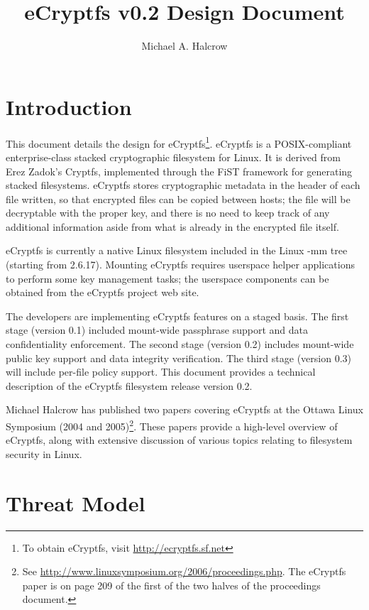 \documentclass{article}
\begin{document}
\title{eCryptfs v0.2 Design Document}

\author{Michael A. Halcrow}

\maketitle

\tableofcontents

\section{Introduction}

This document details the design for eCryptfs\footnote{To obtain
eCryptfs, visit \url{http://ecryptfs.sf.net}}. eCryptfs is a
POSIX-compliant enterprise-class stacked cryptographic filesystem for
Linux. It is derived from Erez Zadok's Cryptfs, implemented through
the FiST framework for generating stacked filesystems. eCryptfs stores
cryptographic metadata in the header of each file written, so that
encrypted files can be copied between hosts; the file will be
decryptable with the proper key, and there is no need to keep track of
any additional information aside from what is already in the encrypted
file itself.

eCryptfs is currently a native Linux filesystem included in the Linux
-mm tree (starting from 2.6.17). Mounting eCryptfs requires userspace
helper applications to perform some key management tasks; the
userspace components can be obtained from the eCryptfs project web
site.

The developers are implementing eCryptfs features on a staged
basis. The first stage (version 0.1) included mount-wide passphrase
support and data confidentiality enforcement. The second stage
(version 0.2) includes mount-wide public key support and data
integrity verification. The third stage (version 0.3) will include
per-file policy support. This document provides a technical
description of the eCryptfs filesystem release version 0.2.

Michael Halcrow has published two papers covering eCryptfs at the
Ottawa Linux Symposium (2004 and 2005)\footnote{See
\url{http://www.linuxsymposium.org/2006/proceedings.php}. The eCryptfs
paper is on page 209 of the first of the two halves of the proceedings
document.}. These papers provide a high-level overview of eCryptfs,
along with extensive discussion of various topics relating to
filesystem security in Linux.

\section{Threat Model}
\end{document}
